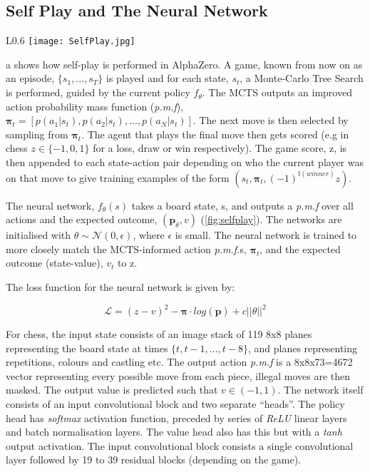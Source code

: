 \documentclass[../main.tex]{subfiles}
\begin{document}
\subsection{Self Play and The Neural Network}

\begin{wrapfigure}{L}{0.6\textwidth}
   \centering
   \texttt{[image: SelfPlay.jpg]}
   \caption{A schematic showing how self-play and policy training are performed. Taken from \cite{AlphaGoZero}.}
   \label{fig:selfplay}
   \vspace{0.5cm}
\end{wrapfigure}

a
shows how self-play is performed in AlphaZero. A game, known from now on as an episode, $\{s_1, ..., s_T\}$ is played and for each state, $s_t$, a Monte-Carlo Tree Search is performed, guided by the current policy $f_\theta$. The MCTS outputs an improved action probability mass function (\textit{p.m.f}), $\boldsymbol{\pi}_t = [p(a_1|s_t), p(a_2|s_t), ..., p(a_N|s_t)]$. The next move is then selected by sampling from $\boldsymbol{\pi}_t$. The agent that plays the final move then gets scored (e.g in chess $z \in \{-1, 0, 1\} $ for a loss, draw or win respectively). The game score, z, is then appended to each state-action pair depending on who the current player was on that move to give training examples of the form $(s_t, \boldsymbol{\pi}_t, (-1)^{\mathbb{I}(winner)}z)$. 

The neural network, $f_\theta(s)$ takes a board state, s, and outputs a \textit{p.m.f} over all actions and the expected outcome, $(\boldsymbol{p}_\theta, v)$ (\cref{fig:selfplay}). The networks are initialised with $\theta \sim \mathcal{N}(0, \epsilon)$, where $\epsilon$ is small. The neural network is trained to more closely match the MCTS-informed action \textit{p.m.f.}s, $\boldsymbol{\pi}_t$, and the expected outcome (state-value), $v_t$ to z.

The loss function for the neural network is given by:

\begin{equation}
    \mathcal{L} = (z - v)^2 - \boldsymbol{\pi} \cdot log(\boldsymbol{p}) + c||\theta||^2
   \label{eqn:loss}
\end{equation}

For chess, the input state consists of an image stack of 119 8x8 planes representing the board state at times $ \{ t, t-1, ..., t-8 \} $, and planes representing repetitions, colours and castling etc. The output action \textit{p.m.f} is a 8x8x73=4672 vector representing every possible move from each piece, illegal moves are then masked. The output value is predicted such that $v \in (-1, 1)$. 
The network itself consists of an input convolutional block and two separate ``heads''. The policy head has \textit{softmax} activation function, preceded by series of \textit{ReLU} linear layers and batch normalisation layers. The value head also has this but with a \textit{tanh} output activation. The input convolutional block consists a single convolutional layer followed by 19 to 39 residual blocks (depending on the game).
\end{document}
